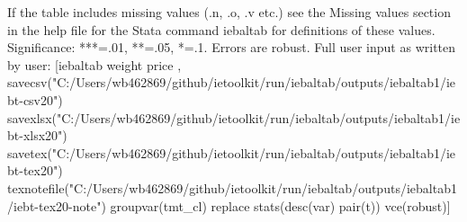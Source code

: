 If the table includes missing values (.n, .o, .v etc.) see the Missing values section in the help file for the Stata command iebaltab for definitions of these values. Significance: ***=.01, **=.05, *=.1. Errors are robust. Full user input as written by user: [iebaltab weight price , savecsv("C:/Users/wb462869/github/ietoolkit/run/iebaltab/outputs/iebaltab1/iebt-csv20") savexlsx("C:/Users/wb462869/github/ietoolkit/run/iebaltab/outputs/iebaltab1/iebt-xlsx20") savetex("C:/Users/wb462869/github/ietoolkit/run/iebaltab/outputs/iebaltab1/iebt-tex20") texnotefile("C:/Users/wb462869/github/ietoolkit/run/iebaltab/outputs/iebaltab1/iebt-tex20-note") groupvar(tmt\_cl) replace stats(desc(var) pair(t)) vce(robust)] 
